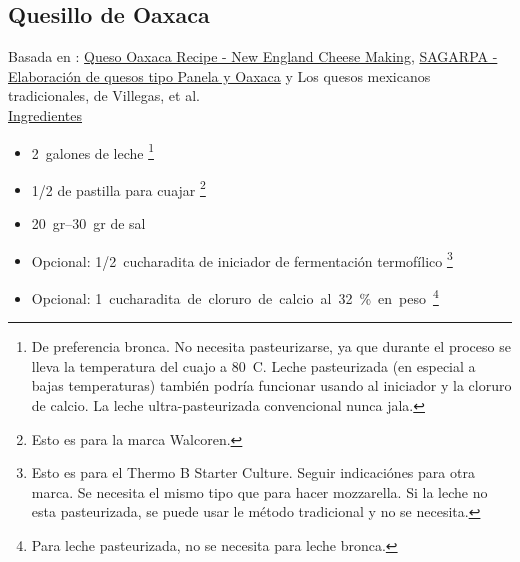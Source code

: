 \subsection{Quesillo de Oaxaca}

Basada en : \href{https://cheesemaking.com/products/queso-oaxaca-recipe}{Queso Oaxaca Recipe - New England Cheese Making}, \href{http://www.sagarpa.gob.mx/desarrolloRural/Documents/fichasaapt/Elaboraci%C3%B3n%20de%20quesos.pdf}{SAGARPA - Elaboración de quesos tipo Panela y Oaxaca} y Los quesos mexicanos tradicionales, de Villegas, et al. \\

\underline{Ingredientes}
\begin{itemize}
\item \SI{2}{galones} de leche \footnote{De preferencia bronca. No necesita pasteurizarse, ya que durante el proceso se lleva la temperatura del cuajo a \SI{80}{C}. Leche pasteurizada (en especial a bajas temperaturas) también podría funcionar usando al iniciador y la cloruro de calcio. La leche ultra-pasteurizada convencional nunca jala.}
\item \num{1/2} de pastilla para cuajar \footnote{Esto es para la marca Walcoren.} 
\item \SIrange{20}{30}{gr} de sal
\item Opcional: \SI{1/2}{cucharadita} de iniciador de fermentación termofílico \footnote{Esto es para el Thermo B Starter Culture. Seguir indicaciónes para otra marca. Se necesita el mismo tipo que para hacer mozzarella. Si la leche no esta pasteurizada, se puede usar le método tradicional y no se necesita.}
\item Opcional: \SI{1} cucharadita de cloruro de calcio al 32\% en peso \footnote{Para leche pasteurizada, no se necesita para leche bronca.}
\end{itemize}



